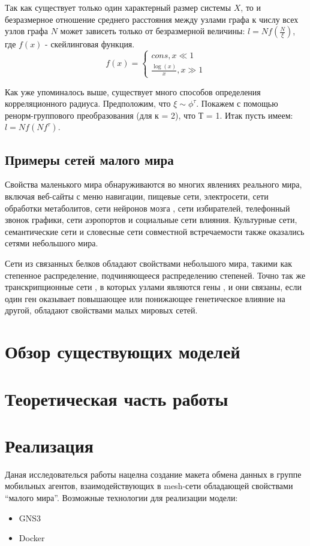 \documentclass[a4paper]{article}
\begin{document}
Так как существует только один характерный размер системы $X$, то и безразмерное отношение среднего расстояния между узлами графа к числу всех узлов графа $N$ может зависеть только от безразмерной величины: $l = N f( \frac{N}{\xi})$, где $f(x)$ - скейлинговая функция. 
\begin{equation*}
    f(x) = 
    \begin{cases}
       cons, x \ll 1 \\
        \frac{\log(x)}{x}, x \gg 1
    \end{cases}
\end{equation*}

Как уже упоминалось выше, существует много способов определения корреляционного радиуса. Предположим, что $\xi \sim \phi^\tau$.
Покажем с помощью ренорм-группового преобразования (для к = 2), что Т = 1. Итак пусть имеем: $l = Nf(Nf^\tau)$.
\subsection{Примеры сетей малого мира}
Свойства маленького мира обнаруживаются во многих явлениях реального мира, включая веб-сайты с меню навигации, пищевые сети, электросети, сети обработки метаболитов, сети нейронов мозга , сети избирателей, телефонный звонок графики, сети аэропортов и социальные сети влияния. Культурные сети, семантические сети и словесные сети совместной встречаемости также оказались сетями небольшого мира.

Сети из связанных белков обладают свойствами небольшого мира, такими как степенное распределение, подчиняющееся распределению степеней. Точно так же транскрипционные сети , в которых узлами являются гены , и они связаны, если один ген оказывает повышающее или понижающее генетическое влияние на другой, обладают свойствами малых мировых сетей.

 \section{Обзор существующих моделей}
\section{Теоретическая часть работы}

\section[]{Реализация}
Даная исследователься работы нацелна создание макета обмена данных в группе мобильных агентов, взаимодействующих в mesh-сети обладающей свойствами “малого мира”.
Возможные технологии для реализации модели:
\begin{itemize}
    \item GNS3
    \item Docker
\end{itemize}
\end{document}
